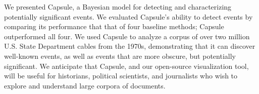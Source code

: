
We presented Capsule, a Bayesian model for detecting and
characterizing potentially significant events. We evaluated Capsule's
ability to detect events by comparing its performance that that of
four baseline methods; Capsule outperformed all four. We used Capsule
to analyze a corpus of over two million U.S. State Department cables
from the 1970s, demonstrating that it can discover well-known events,
as well as events that are more obscure, but potentially
significant. We anticipate that Capsule, and our open-source
visualization tool, will be useful for historians, political
scientists, and journalists who wish to explore and understand large
corpora of documents.
